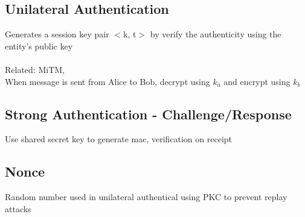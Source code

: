 \documentclass[11pt]{article}
\begin{document}
\begin{multicols*}{3}
\subsection*{Unilateral Authentication}
Generates a session key pair $<$k, t$>$ by verify the authenticity using the entity's public key\\\\
Related: MiTM,\\
When message is sent from Alice to Bob, decrypt using $k_{a}$ and encrypt using $k_{b}$\\
\subsection*{Strong Authentication - Challenge/Response}
Use shared secret key to generate mac, verification on receipt
\subsection*{Nonce}
Random number used in unilateral authentical using PKC to prevent replay attacks

\end{multicols*}
\end{document}
